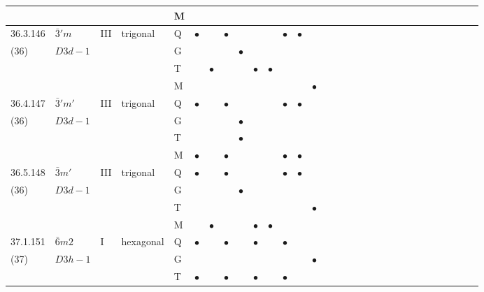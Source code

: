 \documentclass[fleqn,9pt,landscape]{jsarticle}
\begin{document}
\begin{longtable}{lllll|l|l|l|l|l|l|l|l|l|ll|ll|ll|ll|ll|ll|ll|ll}
 &  &  &  & M &  &  &  &  &  &  &  &  &  &  &  &  &  &  &  &  &  &  &  &  &  &  &  &  &  \\ \hline
36.3.146 & \texttt{$\bar{3}'m$} & III & trigonal & Q & $\bullet$ &  & $\bullet$ &  &  &  & $\bullet$ & $\bullet$ &  &  &  &  &  &  &  &  &  &  &  &  &  &  &  &  &  \\
(36) & $D3d-1$ &  &  & G &  &  &  & $\bullet$ &  &  &  &  &  &  &  &  &  &  &  &  &  &  &  &  &  &  &  &  &  \\
 &  &  &  & T &  & $\bullet$ &  &  & $\bullet$ & $\bullet$ &  &  &  &  &  &  &  &  &  &  &  &  &  &  &  &  &  &  &  \\
 &  &  &  & M &  &  &  &  &  &  &  &  & $\bullet$ &  &  &  &  &  &  &  &  &  &  &  &  &  &  &  &  \\ \hline
36.4.147 & \texttt{$\bar{3}'m'$} & III & trigonal & Q & $\bullet$ &  & $\bullet$ &  &  &  & $\bullet$ & $\bullet$ &  &  &  &  &  &  &  &  &  &  &  &  &  &  &  &  &  \\
(36) & $D3d-1$ &  &  & G &  &  &  & $\bullet$ &  &  &  &  &  &  &  &  &  &  &  &  &  &  &  &  &  &  &  &  &  \\
 &  &  &  & T &  &  &  & $\bullet$ &  &  &  &  &  &  &  &  &  &  &  &  &  &  &  &  &  &  &  &  &  \\
 &  &  &  & M & $\bullet$ &  & $\bullet$ &  &  &  & $\bullet$ & $\bullet$ &  &  &  &  &  &  &  &  &  &  &  &  &  &  &  &  &  \\ \hline
36.5.148 & \texttt{$\bar{3}m'$} & III & trigonal & Q & $\bullet$ &  & $\bullet$ &  &  &  & $\bullet$ & $\bullet$ &  &  &  &  &  &  &  &  &  &  &  &  &  &  &  &  &  \\
(36) & $D3d-1$ &  &  & G &  &  &  & $\bullet$ &  &  &  &  &  &  &  &  &  &  &  &  &  &  &  &  &  &  &  &  &  \\
 &  &  &  & T &  &  &  &  &  &  &  &  & $\bullet$ &  &  &  &  &  &  &  &  &  &  &  &  &  &  &  &  \\
 &  &  &  & M &  & $\bullet$ &  &  & $\bullet$ & $\bullet$ &  &  &  &  &  &  &  &  &  &  &  &  &  &  &  &  &  &  &  \\ \hline
37.1.151 & \texttt{$\bar{6}m2$} & I & hexagonal & Q & $\bullet$ &  & $\bullet$ &  & $\bullet$ &  & $\bullet$ &  &  &  &  &  &  &  &  &  &  &  &  &  &  &  &  &  &  \\
(37) & $D3h-1$ &  &  & G &  &  &  &  &  &  &  &  & $\bullet$ &  &  &  &  &  &  &  &  &  &  &  &  &  &  &  &  \\
 &  &  &  & T & $\bullet$ &  & $\bullet$ &  & $\bullet$ &  & $\bullet$ &  &  &  &  &  &  &  &  &  &  &  &  &  &  &  &  &  &  \\

\end{longtable}
\end{document}
